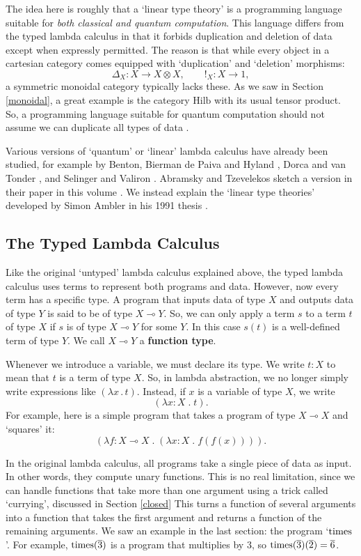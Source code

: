 \documentclass[12pt,twoside,openright]{report}
\newcommand{\Hilb}{\mathrm{Hilb}}
\newcommand{\maps}{\colon}
\newcommand{\lhom}{\multimap}
\newcommand{\tensor}{\otimes}
\newcommand{\Times}{{\rm times}}
\begin{document}
The idea here is roughly that a `linear type theory' is a programming language suitable for {\it both classical and quantum computation}.  This language differs from the typed lambda calculus in that it forbids duplication and deletion of data except when expressly permitted.  The reason is that while every object in a cartesian category comes equipped with `duplication' and `deletion' morphisms:
\[   \Delta_X \maps X \to X \tensor X, \qquad !_X \maps X \to 1 , \]
a symmetric monoidal category typically lacks these.  As we saw in Section \ref{monoidal}, a great example is the category $\Hilb$ with its usual tensor product.  So, a programming language suitable for quantum computation should not assume we can duplicate all types of data \cite{ChuangNielsen,WZ}.

Various versions of `quantum' or `linear' lambda calculus have already been studied, for example by Benton, Bierman de Paiva and Hyland
\cite{BBPH}, Dorca and van Tonder \cite{vT}, and Selinger and Valiron
\cite{SV}.  Abramsky and Tzevelekos sketch a version in their paper in this volume \cite{AT}.  We instead explain the `linear type theories'
developed by Simon Ambler in his 1991 thesis \cite{Ambler}.

\subsection{The Typed Lambda Calculus}
\label{lambda}

Like the original `untyped' lambda calculus explained above, the typed lambda calculus uses terms to represent both programs and data. However, now every term has a specific type.  A program that inputs data of type $X$ and outputs data of type $Y$ is said to be of type $X
\lhom Y$.  So, we can only apply a term $s$ to a term $t$ of type $X$
if $s$ is of type $X \lhom Y$ for some $Y$.  In this case $s(t)$ is a well-defined term of type $Y$.  We call $X \lhom Y$ a {\bf function type}.

Whenever we introduce a variable, we must declare its type.  We write
$t\!:\!X$ to mean that $t$ is a term of type $X$.  So, in lambda abstraction, we no longer simply write expressions like $(\lambda x\, . \,t)$.  Instead, if $x$ is a variable of type $X$, we write
\[      (\lambda x\!:\!X \; .\; t) . \] 
For example, here is a simple program that takes a program of type $X \lhom X$ and `squares' it:
\[       (\lambda f\!:\!X \lhom X \;.\;(\lambda \!x:\!X \; . \; f(f(x)))) .\]

In the original lambda calculus, all programs take a single piece of data as input.  In other words, they compute unary functions.  This is no real limitation, since we can handle functions that take more than one argument using a trick called `currying', discussed in Section
\ref{closed}  This turns a function of several arguments into a function that takes the first argument and returns a function of the remaining arguments.  We saw an example in the last section: the program `$\Times$'.  For example, $\Times(\overline{3})$ is a program that multiplies by 3, so $\Times(\overline{3})(\overline{2}) =
\overline{6}$.
\end{document}
